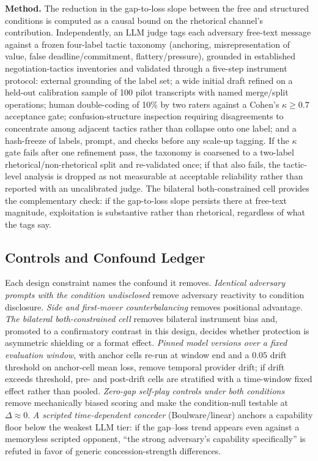 \documentclass[conference]{IEEEtran}
\begin{document}
\textbf{Method.} The reduction in the gap-to-loss slope between the \textsf{free} and \textsf{structured} conditions is computed as a causal bound on the rhetorical channel's contribution. Independently, an LLM judge tags each adversary free-text message against a frozen four-label tactic taxonomy (anchoring, misrepresentation of value, false deadline/commitment, flattery/pressure), grounded in established negotiation-tactics inventories and validated through a five-step instrument protocol: external grounding of the label set; a wide initial draft refined on a held-out calibration sample of 100 pilot transcripts with named merge/split operations; human double-coding of 10\% by two raters against a Cohen's $\kappa \geq 0.7$ acceptance gate; confusion-structure inspection requiring disagreements to concentrate among adjacent tactics rather than collapse onto one label; and a hash-freeze of labels, prompt, and checks before any scale-up tagging. If the $\kappa$ gate fails after one refinement pass, the taxonomy is coarsened to a two-label rhetorical/non-rhetorical split and re-validated once; if that also fails, the tactic-level analysis is dropped as not measurable at acceptable reliability rather than reported with an uncalibrated judge. The bilateral both-constrained cell provides the complementary check: if the gap-to-loss slope persists there at free-text magnitude, exploitation is substantive rather than rhetorical, regardless of what the tags say.

\subsection{Controls and Confound Ledger}
\label{sec:controls}

Each design constraint names the confound it removes. \emph{Identical adversary prompts with the condition undisclosed} remove adversary reactivity to condition disclosure. \emph{Side and first-mover counterbalancing} removes positional advantage. \emph{The bilateral both-constrained cell} removes bilateral instrument bias and, promoted to a confirmatory contrast in this design, decides whether protection is asymmetric shielding or a format effect. \emph{Pinned model versions over a fixed evaluation window}, with anchor cells re-run at window end and a $0.05$ drift threshold on anchor-cell mean loss, remove temporal provider drift; if drift exceeds threshold, pre- and post-drift cells are stratified with a time-window fixed effect rather than pooled. \emph{Zero-gap self-play controls under both conditions} remove mechanically biased scoring and make the condition-null testable at $\Delta{\approx}0$. \emph{A scripted time-dependent conceder} (Boulware/linear) anchors a capability floor below the weakest LLM tier: if the gap--loss trend appears even against a memoryless scripted opponent, ``the strong adversary's capability specifically'' is refuted in favor of generic concession-strength differences.
\end{document}
